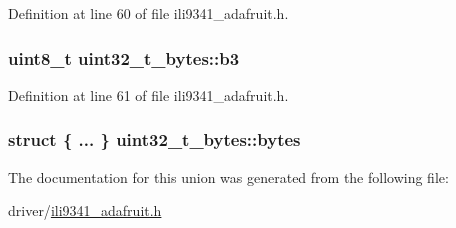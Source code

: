Definition at line 60 of file ili9341\-\_\-adafruit.\-h.

\hypertarget{unionuint32__t__bytes_abd7739cae59fab7cf712d53f337b378a}{
\subsubsection[{b3}]{\setlength{\rightskip}{0pt plus 5cm}uint8\-\_\-t uint32\-\_\-t\-\_\-bytes\-::b3}}\label{unionuint32__t__bytes_abd7739cae59fab7cf712d53f337b378a}


Definition at line 61 of file ili9341\-\_\-adafruit.\-h.

\hypertarget{unionuint32__t__bytes_a50aeebe398ee3b740421f1cc8d8583b8}{
\subsubsection[{bytes}]{\setlength{\rightskip}{0pt plus 5cm}struct \{ ... \}   uint32\-\_\-t\-\_\-bytes\-::bytes}}\label{unionuint32__t__bytes_a50aeebe398ee3b740421f1cc8d8583b8}


The documentation for this union was generated from the following file\-:\begin{DoxyCompactItemize}
\item 
driver/\hyperlink{ili9341__adafruit_8h}{ili9341\-\_\-adafruit.\-h}\end{DoxyCompactItemize}
